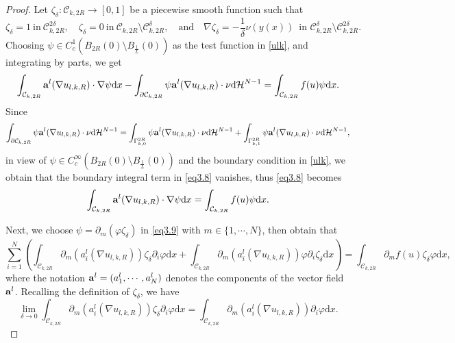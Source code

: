 \documentclass[12pt]{amsart}
\theoremstyle{definition}
\theoremstyle{remark}
\theoremstyle{conclusion}
\theoremstyle{conjecture}
\numberwithin{equation}{section}
\begin{document}
\begin{proof}
Let $\zeta _{\delta}: \mathcal{C}_{k,2R}\rightarrow[0,1]$ be a piecewise smooth function such that
\begin{equation*}
    \zeta _{\delta}=1\ \text{in}\ \mathcal{C}_{k,2R}^{2\delta},\quad
    \zeta _{\delta}=0\ \text{in}\ \mathcal{C}_{k,2R}\setminus\mathcal{C}_{k,2R}^{\delta},\quad \text{and}\quad
    \nabla\zeta _{\delta}=-\frac{1}{\delta}\nu(y(x))\,\,\, \text{in}\,\, \mathcal{C}_{k,2R}^{\delta}\setminus\mathcal{C}_{k,2R}^{2\delta}.
\end{equation*}
Choosing $\psi \in C^{1}_c(B_{2R}(0)\setminus B_{\frac{1}{L}}(0))$ as the test function in \eqref{ulk}, and integrating by
parts, we get
\begin{equation}\label{eq3.8}
    \int_{\mathcal{C}_{k,2R}}{\bf{a}}^l(\nabla u_{l,k,R})\cdot\nabla \psi \mathrm{d}x-\int_{\partial\mathcal{C}_{k,2R}}\psi {\bf{a}}^l(\nabla u_{l,k,R})\cdot\nu \mathrm{d}\mathcal{H}^{N-1}
    =\int_{\mathcal{C}_{k,2R}}f(u)\psi \mathrm{d}x.
\end{equation}
Since
\begin{equation*}
    \int_{\partial\mathcal{C}_{k,2R}}\psi {\bf{a}}^l(\nabla u_{l,k,R})\cdot\nu \mathrm{d}\mathcal{H}^{N-1}=\int_{\Gamma_{k,0}^{2R}}\psi {\bf{a}}^l(\nabla u_{l,k,R})\cdot\nu \mathrm{d}\mathcal{H}^{N-1}
    +\int_{\Gamma_{k,1}^{2R}}\psi {\bf{a}}^l(\nabla u_{l,k,R})\cdot\nu \mathrm{d}\mathcal{H}^{N-1},
\end{equation*}
in view of $\psi \in C^{\infty}_c(B_{2R}(0)\setminus B_{\frac{1}{L}}(0))$ and the boundary condition in \eqref{ulk}, we obtain
 that the boundary integral term in \eqref{eq3.8} vanishes, thus \eqref{eq3.8} becomes
 \begin{equation}\label{eq3.9}
    \int_{\mathcal{C}_{k,2R}}{\bf{a}}^l(\nabla u_{l,k,R})\cdot\nabla \psi \mathrm{d}x= \int_{\mathcal{C}_{k,2R}}f(u)\psi \mathrm{d}x.
 \end{equation}

Next, we choose $\psi=\partial_m(\varphi\zeta_{\delta})$ in \eqref{eq3.9} with $m\in\{1,\cdots,N\}$, then obtain that
\begin{equation*}
    \sum\limits_{i=1}^{N}\left(\int_{\mathcal{C}_{k,2R}}\partial_m (a^l_i(\nabla u_{l,k,R}))\zeta_{\delta}\partial_i\varphi \mathrm{d}x+\int_{\mathcal{C}_{k,2R}}\partial_m (a^l_i(\nabla u_{l,k,R}))\varphi\partial_i\zeta_{\delta} \mathrm{d}x\right)
    = \int_{\mathcal{C}_{k,2R}}\partial_m f(u)\zeta_{\delta}\varphi \mathrm{d}x,
\end{equation*}
where the notation ${\bf{a}}^l=(a^l_1,\cdots,a^l_N)$ denotes the components of the vector field ${\bf{a}}^l$. Recalling the definition of $\zeta_{\delta}$, we have
\begin{equation*}
    \lim\limits_{\delta\rightarrow0}\int_{\mathcal{C}_{k,2R}}\partial_m (a^l_i(\nabla u_{l,k,R}))\zeta_{\delta}\partial_i\varphi \mathrm{d}x=
    \int_{\mathcal{C}_{k,2R}}\partial_m (a^l_i(\nabla u_{l,k,R}))\partial_i\varphi \mathrm{d}x.
\end{equation*}


\end{proof}
\end{document}
